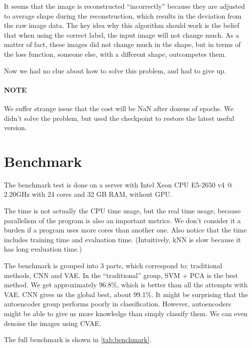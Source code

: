 \documentclass[a4paper,10pt,UTF8]{article}
\numberwithin{equation}{section}
\numberwithin{figure}{section}
\begin{document}
It seems that the image is reconstructed ``incorrectly'' because they are adjusted to average shape during the reconstruction, which results in the deviation from the raw image data. The key idea why this algorithm should work is the belief that when using the correct label, the input image will not change much. As a matter of fact, these images did not change much in the shape, but in terms of the loss function, someone else, with a different shape, outcompetes them.

Now we had no clue about how to solve this problem, and had to give up.

\paragraph{NOTE} We suffer strange issue that the cost will be NaN after dozens of epochs. We didn't solve the problem, but used the checkpoint to restore the latest useful version.


\section{Benchmark}

\label{benchmark}

The benchmark test is done on a server with Intel Xeon CPU E5-2650 v4 @ 2.20GHz with 24 cores and 32 GB RAM, without GPU.

The time is not actually the CPU time usage, but the real time usage, because parallelism of the program is also an important metrics. We don't consider it a burden if a program uses more cores than another one. Also notice that the time includes training time and evaluation time. (Intuitively, kNN is slow because it has long evaluation time.)

The benchmark is grouped into 3 parts, which correspond to: traditional methods, CNN and VAE. In the ``traditional'' group, SVM + PCA is the best method. We get approximately 96.8\%, which is better than all the attempts with VAE. CNN gives us the global best, about 99.1\%. It might be surprising that the autoencoder group performs poorly in classification. However, autoencoders might be able to give us more knowledge than simply classify them. We can even denoise the images using CVAE.

The full benchmark is shown in \autoref{tab:benchmark}.
\end{document}
